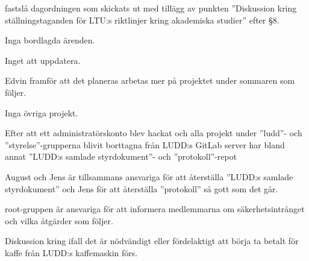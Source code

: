 \documentclass{protokoll}
\begin{document}
\newpage  


\begin{beslut}
     \att fastslå dagordningen som skickats ut med tillägg av punkten
     ''Diskussion kring ställningstaganden för LTU:s riktlinjer kring
     akademiska studier'' efter \S 8.
\end{beslut}

Inga bordlagda ärenden.

Inget att uppdatera. 

Edvin framför att det planeras arbetas mer på projektet under sommaren som
följer. 

Inga övriga projekt. 

Efter att ett administratörskonto blev hackat och alla projekt under ''ludd''-
och ''styrelse''-grupperna blivit borttagna från LUDD:s GitLab server har bland
annat ''LUDD:s samlade styrdokument''- och ''protokoll''-repot

August och Jens är tillsammans ansvariga för att återställa ''LUDD:s samlade 
styrdokument'' och Jens för att återställa ''protokoll'' så gott som det går. 

root-gruppen är ansvariga för att informera medlemmarna om säkerhetsintrånget
och vilka åtgärder som följer.

 Diskussion kring ifall det är nödvändigt eller fördelaktigt att börja ta
 betalt för kaffe från LUDD:s kaffemaskin förs. 
\end{document}
